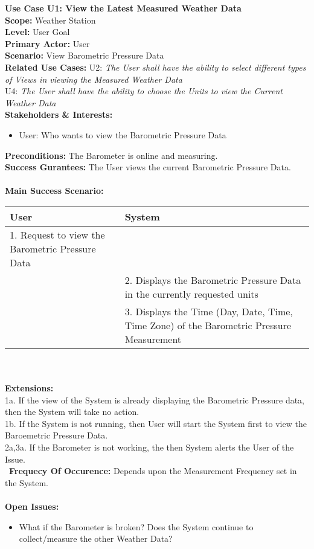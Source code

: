\documentclass[letterpaper]{article}
\begin{document}
\noindent
\textbf{Use Case U1:  View the Latest Measured Weather Data}\\
\textbf{Scope:  }Weather Station\\
\textbf{Level:  }User Goal\\
\textbf{Primary Actor:  }User\\
\textbf{Scenario:  }View Barometric Pressure Data\\
\textbf{Related Use Cases:  }U2: \textit{The User shall have the
ability to select different types of Views in viewing the Measured
Weather Data}\\ U4:  \textit{The User shall have the ability to
choose the Units to view the Current Weather Data}\\
\textbf{Stakeholders \& Interests:  }
\begin{itemize}
\item User:  Who wants to view the Barometric Pressure Data
\end{itemize}
\textbf{Preconditions:  }The  Barometer is online and measuring.\\
\textbf{Success Gurantees:  }The User views the current Barometric
Pressure Data.\\\\
\textbf{Main Success Scenario:  }\\
\begin{tabular}{|p{6cm}|p{6cm}|}\hline
\textbf{User} & \textbf{System}\\\hline
1.  Request to view the Barometric Pressure Data & \\\hline
& 2.  Displays the Barometric Pressure Data in the currently
requested units\\\hline
& 3.  Displays the Time (Day, Date, Time, Time Zone) of the
Barometric Pressure Measurement\\\hline
\end{tabular}\\\\
\textbf{Extensions:  }\\
1a.  If the view of the System is already displaying the Barometric
Pressure data, then the System will take no action.\\
1b.  If the System is not running, then User will start the System
first to view the Baroemetric Pressure Data.\\
2a,3a.  If the Barometer is not working, the then System
alerts the User of the Issue.\\\
\textbf{Frequecy Of Occurence: } Depends upon the Measurement
Frequency set in the System.\\\\
\textbf{Open Issues: }
\begin{itemize}
\item What if the Barometer is broken?  Does the System continue
to collect/measure the other Weather Data?
\end{itemize}
\end{document}
